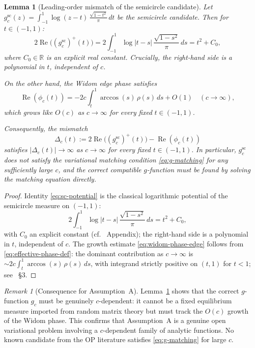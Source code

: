 \documentclass[12pt,a4paper]{amsart}
\newtheorem{lemma}[theorem]{Lemma}
\theoremstyle{definition}
\theoremstyle{remark}
\newtheorem{remark}[theorem]{Remark}
\begin{document}
\begin{lemma}[Leading-order mismatch of the semicircle candidate]
\label{lem:semicircle-mismatch}
Let $g_c^{\mathrm{sc}}(z) =
\int_{-1}^1 \log(z-t)\,\frac{\sqrt{1-t^2}}{\pi}\,dt$
be the semicircle candidate.
Then for $t \in (-1,1)$:
\begin{equation}\label{eq:sc-potential}
  2\operatorname{Re}\bigl((g_c^{\mathrm{sc}})^+(t)\bigr)
  = 2\int_{-1}^1 \log|t-s|\,\frac{\sqrt{1-s^2}}{\pi}\,ds
  = t^2 + C_0,
\end{equation}
where $C_0 \in \mathbb{R}$ is an explicit real constant.
Crucially, the right-hand side is a polynomial in $t$, independent of $c$.

On the other hand, the Widom edge phase satisfies
\begin{equation}\label{eq:widom-phase-edge}
  \operatorname{Re}(\phi_c(t))
  = -2c\int_t^1 \arccos(s)\,\rho(s)\,ds + O(1)
  \quad (c \to \infty),
\end{equation}
which grows like $O(c)$ as $c\to\infty$ for every fixed $t\in(-1,1)$.

Consequently, the mismatch
\[
  \Delta_c(t) := 2\operatorname{Re}\bigl((g_c^{\mathrm{sc}})^+(t)\bigr)
  - \operatorname{Re}(\phi_c(t))
\]
satisfies $|\Delta_c(t)| \to \infty$ as $c \to \infty$ for every
fixed $t \in (-1,1)$.
In particular, $g_c^{\mathrm{sc}}$ does \emph{not} satisfy the
variational matching condition \eqref{eq:g-matching} for any
sufficiently large $c$, and the correct compatible $g$-function
must be found by solving the matching equation directly.
\end{lemma}

\begin{proof}
Identity \eqref{eq:sc-potential} is the classical logarithmic potential
of the semicircle measure on $(-1,1)$:
\[
  2\int_{-1}^1\log|t-s|\,\frac{\sqrt{1-s^2}}{\pi}\,ds = t^2 + C_0,
\]
with $C_0$ an explicit constant (cf.~\cite{Deift1999} Appendix);
the right-hand side is a polynomial in $t$, independent of $c$.
The growth estimate \eqref{eq:widom-phase-edge} follows from
\eqref{eq:effective-phase-def}: the dominant contribution as $c\to\infty$
is $\sim 2c\int_t^1\arccos(s)\,\rho(s)\,ds$, with integrand strictly
positive on $(t,1)$ for $t<1$; see~\cite{Widom1964} \S3.
\end{proof}

\begin{remark}[Consequence for Assumption~A]
\label{rem:mismatch-consequence}
Lemma~\ref{lem:semicircle-mismatch} shows that the correct $g$-function
$g_c$ must be genuinely $c$-dependent: it cannot be a fixed equilibrium
measure imported from random matrix theory but must track the $O(c)$
growth of the Widom phase.
This confirms that Assumption~A is a genuine open variational problem
involving a $c$-dependent family of analytic functions.
No known candidate from the OP literature satisfies
\eqref{eq:g-matching} for large $c$.
\end{remark}
\end{document}
